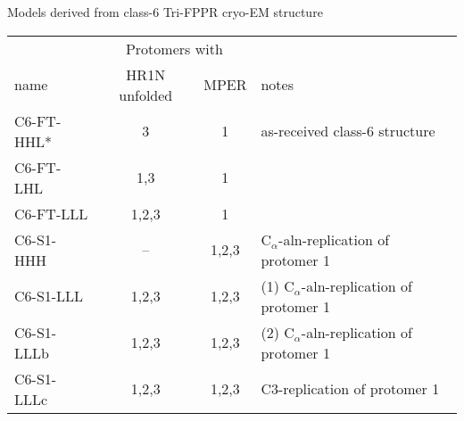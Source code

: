 \begin{frame}[fragile]{Models derived from class-6 Tri-FPPR cryo-EM structure}
        \begin{center}
            \begin{tabular}{lccl}
                     & \multicolumn{2}{c}{Protomers with} & \\
                name & HR1N unfolded  & MPER & notes\\\hline
                C6-FT-HHL* & 3 & 1 & as-received class-6 structure\\
                C6-FT-LHL & 1,3 & 1 & \\
                C6-FT-LLL & 1,2,3 & 1 & \\
                C6-S1-HHH & -- & 1,2,3 & C$_\alpha$-aln-replication of protomer 1\\
                C6-S1-LLL & 1,2,3 & 1,2,3 & (1) C$_\alpha$-aln-replication of protomer 1\\
                C6-S1-LLLb & 1,2,3 & 1,2,3 & (2) C$_\alpha$-aln-replication of protomer 1\\
                C6-S1-LLLc & 1,2,3 & 1,2,3 & C3-replication of protomer 1\\\hline
            \end{tabular}
        \end{center}
\end{frame}

